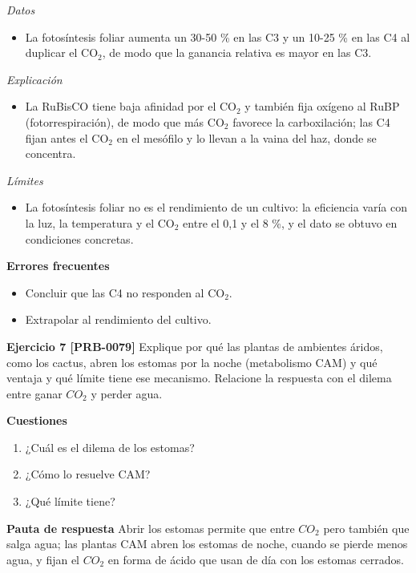 \documentclass{book}
\begin{document}
\noindent\textit{Datos}
\begin{itemize}
\item La fotosíntesis foliar aumenta un 30-50 \% en las C3 y un 10-25 \% en las C4 al duplicar el CO\({}_{2}\), de modo que la ganancia relativa es mayor en las C3.
\end{itemize}

\noindent\textit{Explicación}
\begin{itemize}
\item La RuBisCO tiene baja afinidad por el CO\({}_{2}\) y también fija oxígeno al RuBP (fotorrespiración), de modo que más CO\({}_{2}\) favorece la carboxilación; las C4 fijan antes el CO\({}_{2}\) en el mesófilo y lo llevan a la vaina del haz, donde se concentra.
\end{itemize}

\noindent\textit{Límites}
\begin{itemize}
\item La fotosíntesis foliar no es el rendimiento de un cultivo: la eficiencia varía con la luz, la temperatura y el CO\({}_{2}\) entre el 0,1 y el 8 \%, y el dato se obtuvo en condiciones concretas.
\end{itemize}

\noindent\textbf{Errores frecuentes}
\begin{itemize}
\item Concluir que las C4 no responden al CO\({}_{2}\).
\item Extrapolar al rendimiento del cultivo.
\end{itemize}

\noindent\textbf{Ejercicio 7 [PRB-0079]}
Explique por qué las plantas de ambientes áridos, como los cactus, abren los estomas por la noche (metabolismo CAM) y qué ventaja y qué límite tiene ese mecanismo. Relacione la respuesta con el dilema entre ganar \(CO_{2}\) y perder agua.


\noindent\textbf{Cuestiones}
\begin{enumerate}
\item ¿Cuál es el dilema de los estomas?
\item ¿Cómo lo resuelve CAM?
\item ¿Qué límite tiene?
\end{enumerate}

\noindent\textbf{Pauta de respuesta}
Abrir los estomas permite que entre \(CO_{2}\) pero también que salga agua; las plantas CAM abren los estomas de noche, cuando se pierde menos agua, y fijan el \(CO_{2}\) en forma de ácido que usan de día con los estomas cerrados.
\end{document}

